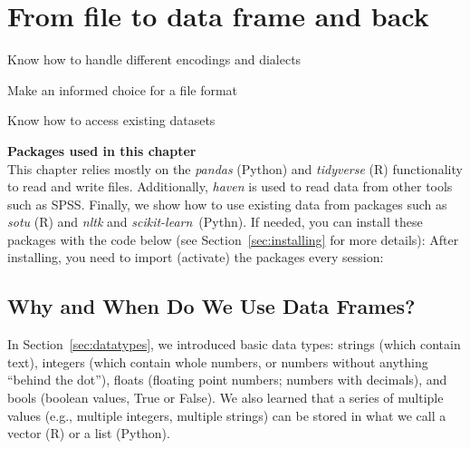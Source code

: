 \chapter{From file to data frame and back}
\label{chap:filetodata}


\begin{abstract}{Abstract}
  This chapter teaches you basics of file handling, such as different file formats and encodings. It introduces csv files, json files, plain text files, and binary file formats. We discuss different approaches to organizing data in files, and how to write data frames to and read them from these files].  Finally, we provide guidance for retrieving example datasets.
\end{abstract}


\begin{objectives}
\item Know how to handle different encodings and dialects
\item Make an informed choice for a file format
\item Know how to access existing datasets
\end{objectives}

\begin{feature}
  \textbf{Packages used in this chapter}\\
  This chapter relies mostly on the \emph{pandas} (Python) and \emph{tidyverse} (R) functionality to read and write files. Additionally, \emph{haven} is used to read data from other tools such as SPSS.
  Finally, we show how to use existing data from packages such as \emph{sotu} (R) and \emph{nltk} and \emph{scikit-learn}\ (Pythn).
  If needed, you can install these packages with the code below
  (see Section~\ref{sec:installing} for more details):
  \noindent After installing, you need to import (activate) the packages every session:
\end{feature}


\section{Why and When Do We Use Data Frames?}

In Section~\ref{sec:datatypes}, we introduced basic data types: strings (which contain text), integers (which contain whole numbers, or numbers without anything ``behind the dot''), floats (floating point numbers; numbers with decimals), and bools (boolean values, True or False).
We also learned that a series of multiple values (e.g., multiple integers, multiple strings) can be stored in what we call a vector (R) or a list (Python).

